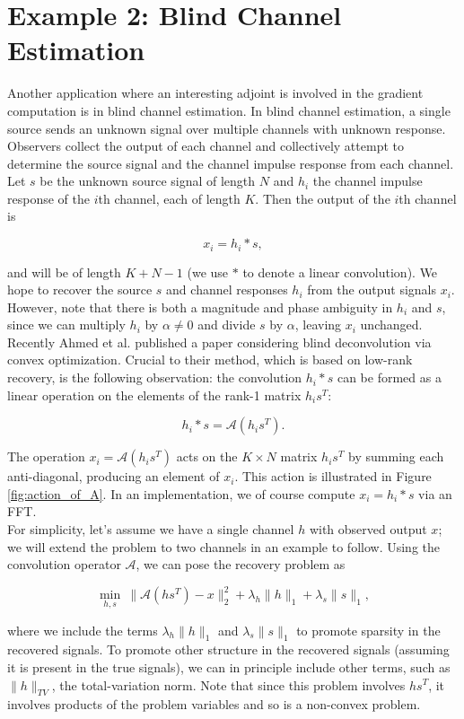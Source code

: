 \documentclass[journal]{IEEEtran}
\begin{document}
\section{Example 2: Blind Channel Estimation}
Another application where an interesting adjoint is involved in the gradient computation is in blind channel estimation.  In blind channel estimation, a single source sends an unknown signal over multiple channels with unknown response.  Observers collect the output of each channel and collectively attempt to determine the source signal and the channel impulse response from each channel.  Let $s$ be the unknown source signal of length $N$ and $h_i$ the channel impulse response of the $i$th channel, each of length $K$.  Then the output of the $i$th channel is

\[ x_i = h_i\ast s, \] 

\noindent and will be of length $K+N-1$ (we use $\ast$ to denote a linear convolution).  We hope to recover the source $s$ and channel responses $h_i$ from the output signals $x_i$.   However, note that there is both a magnitude and phase ambiguity in $h_i$ and $s$, since we can multiply $h_i$ by $\alpha\neq 0$ and divide $s$ by $\alpha$, leaving $x_i$ unchanged.\\

Recently Ahmed et al. \cite{ahmed_2013} published a paper considering blind deconvolution via convex optimization.  Crucial to their method, which is based on low-rank recovery, is the following observation: the convolution $h_i\ast s$ can be formed as a linear operation on the elements of the rank-1 matrix $h_is^T$:

\[ h_i\ast s = \mathcal{A}(h_is^T). \] 

\noindent The operation $x_i=\mathcal{A}(h_is^T)$ acts on the $K\times N$ matrix $h_is^T$ by summing each anti-diagonal, producing an element of $x_i$.  This action is illustrated in Figure \ref{fig:action_of_A}.  In an implementation, we of course compute $x_i=h_i\ast s$ via an FFT.\\

For simplicity, let's assume we have a single channel $h$ with observed output $x$; we will extend the problem to two channels in an example to follow.  Using the convolution operator $\mathcal{A}$, we can pose the recovery problem as

\[ \min_{h,s}~ \|\mathcal{A}(hs^T)-x\|_2^2 + \lambda_h\|h\|_1 + \lambda_s \|s\|_1, \] 

\noindent where we include the terms $\lambda_h\|h\|_1$ and $\lambda_s\|s\|_1$ to promote sparsity in the recovered signals.  To promote other structure in the recovered signals (assuming it is present in the true signals), we can in principle include other terms, such as $\|h\|_{TV}$, the total-variation norm.  Note that since this problem involves $hs^T$, it involves products of the problem variables and so is a non-convex problem.\\
\end{document}
